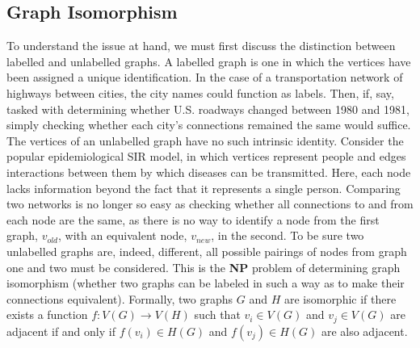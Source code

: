 \documentclass[11pt]{article}
\begin{document}
\subsection{Graph Isomorphism}
\indent To understand the issue at hand, we must first discuss the distinction between labelled and unlabelled graphs. A labelled graph is one in which the vertices have been assigned a unique identification. In the case of a transportation network of highways between cities, the city names could function as labels. Then, if, say, tasked with determining whether U.S. roadways changed between 1980 and 1981, simply checking whether each city's connections remained the same would suffice. The vertices of an unlabelled graph have no such intrinsic identity. Consider the popular epidemiological SIR model, in which vertices represent people and edges interactions between them by which diseases can be transmitted. Here, each node lacks information beyond the fact that it represents a single person. Comparing two networks is no longer so easy as checking whether all connections to and from each node are the same, as there is no way to identify a node from the first graph, $v_{old}$, with an equivalent node, $v_{new}$, in the second. To be sure two unlabelled graphs are, indeed, different, all possible pairings of nodes from graph one and two must be considered. This is the \textbf{NP} problem of determining graph isomorphism (whether two graphs can be labeled in such a way as to make their connections equivalent). Formally, two graphs $G$ and $H$ are isomorphic if there exists a function $f:V(G) \rightarrow V(H)$ such that $v_{i} \in V(G)$ and $v_{j} \in V(G)$ are adjacent if and only if $f(v_{i}) \in H(G)$ and $f(v_{j}) \in H(G)$ are also adjacent. \vspace{1mm}
\end{document}
